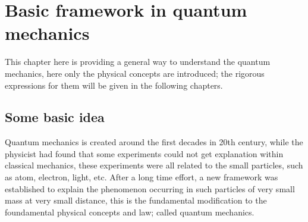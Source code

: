 %
%
%
%
%




\chapter{Basic framework in quantum mechanics}
\label{basic_chapter}
%
%
%
This chapter here is providing a general way to understand the
quantum mechanics, here only the physical concepts are introduced;
the rigorous expressions for them will be given in the following
chapters.
\section{Some basic idea}
%
%
Quantum mechanics is created around the first decades in 20th century,
while the physicist had found that some experiments could not get
explanation within classical mechanics, these experiments were all
related to the small particles, such as atom, electron, light,
etc. After a long time effort, a new framework was established to
explain the phenomenon occurring in such particles of very small mass
at very small distance, this is the fundamental modification to the
foundamental physical concepts and law; called quantum mechanics.

